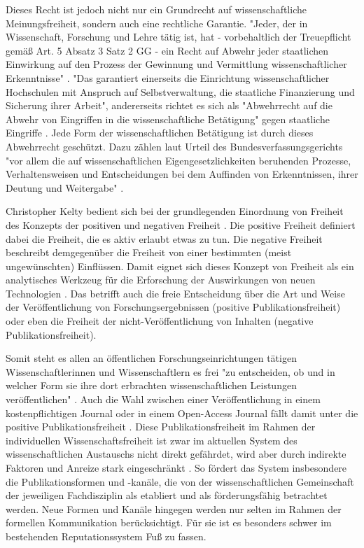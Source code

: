 Dieses Recht ist jedoch nicht nur ein Grundrecht auf wissenschaftliche Meinungsfreiheit, sondern auch eine rechtliche Garantie. "Jeder, der in Wissenschaft, Forschung und Lehre tätig ist, hat - vorbehaltlich der Treuepflicht gemäß Art. 5 Absatz 3 Satz 2 GG - ein Recht auf Abwehr jeder staatlichen Einwirkung auf den Prozess der Gewinnung und Vermittlung wissenschaftlicher Erkenntnisse" \cite{suchen_BVG}. "Das garantiert einerseits die Einrichtung wissenschaftlicher Hochschulen mit Anspruch auf Selbstverwaltung, die staatliche Finanzierung und Sicherung ihrer Arbeit"\cite{suchen_BVG}, andererseits richtet es sich als "Abwehrrecht auf die Abwehr von Eingriffen in die wissenschaftliche Betätigung" gegen staatliche Eingriffe \cite{mayen_grundrechte_forscher} \cite{spindler_2006_rechtloa}. Jede Form der wissenschaftlichen Betätigung ist durch dieses Abwehrrecht geschützt. Dazu zählen laut Urteil des Bundesverfassungsgerichts "vor allem die auf wissenschaftlichen Eigengesetzlichkeiten beruhenden Prozesse, Verhaltensweisen und Entscheidungen bei dem Auffinden von Erkenntnissen, ihrer Deutung und Weitergabe" \cite{suchen}.

Christopher Kelty bedient sich bei der grundlegenden Einordnung von Freiheit des Konzepts der positiven und negativen Freiheit \cite{kelty_2014_freedom}. Die positive Freiheit definiert dabei die Freiheit, die es aktiv erlaubt etwas zu tun. Die negative Freiheit beschreibt demgegenüber die Freiheit von einer bestimmten (meist ungewünschten) Einflüssen. Damit eignet sich dieses Konzept von Freiheit als ein analytisches Werkzeug für die Erforschung der Auswirkungen von neuen Technologien \cite{kelty_2014_freedom}. Das betrifft auch die freie Entscheidung über die Art und Weise der Veröffentlichung von Forschungsergebnissen (positive Publikationsfreiheit) \cite{Fangerau_2014} \cite[:190]{Fehling_2014} oder eben die Freiheit der nicht-Veröffentlichung von Inhalten (negative Publikationsfreiheit).

Somit steht es allen an öffentlichen Forschungseinrichtungen tätigen Wissenschaftlerinnen und Wissenschaftlern es frei "zu entscheiden, ob und in welcher Form sie ihre dort erbrachten wissenschaftlichen Leistungen veröffentlichen" \cite{Schmidt_2009}. Auch die Wahl zwischen einer Veröffentlichung in einem kostenpflichtigen Journal oder in einem Open-Access Journal fällt damit unter die positive Publikationsfreiheit \cite[:190]{Fehling_2014}. Diese Publikationsfreiheit
im Rahmen der individuellen Wissenschaftsfreiheit ist zwar im aktuellen System des wissenschaftlichen Austauschs nicht direkt gefährdet, wird aber durch indirekte Faktoren und Anreize stark eingeschränkt \cite{binswanger_2014_excellence}. So fördert das System insbesondere die Publikationsformen und -kanäle, die von der wissenschaftlichen Gemeinschaft der jeweiligen Fachdisziplin als etabliert und als förderungsfähig betrachtet werden. Neue Formen und Kanäle hingegen werden nur selten im Rahmen der formellen Kommunikation berücksichtigt. Für sie ist es besonders schwer im bestehenden Reputationssystem Fuß zu fassen.

